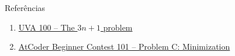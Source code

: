 \begin{frame}[fragile]{Referências}

    \begin{enumerate}
        \item \href{https://uva.onlinejudge.org/index.php?option=com_onlinejudge&Itemid=8&page=show_problem&category=0&problem=36&mosmsg=Submission+received+with+ID+22978803}{UVA 100 -- The $3n + 1$ problem}

        \item \href{https://atcoder.jp/contests/abc101/tasks/arc099_a}{AtCoder Beginner Contest 101 -- Problem C: Minimization}
    \end{enumerate}

\end{frame}
